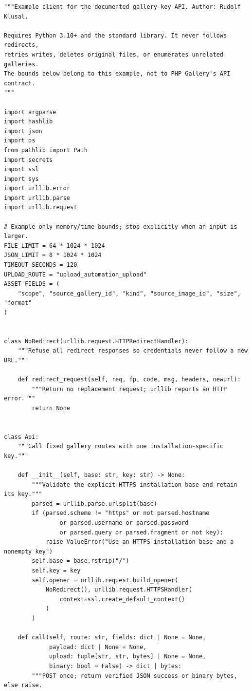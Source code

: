 \documentclass[11pt,a4paper]{article}
\begin{document}
\begin{lstlisting}[language={}]
"""Example client for the documented gallery-key API. Author: Rudolf Klusal.

Requires Python 3.10+ and the standard library. It never follows redirects,
retries writes, deletes original files, or enumerates unrelated galleries.
The bounds below belong to this example, not to PHP Gallery's API contract.
"""

import argparse
import hashlib
import json
import os
from pathlib import Path
import secrets
import ssl
import sys
import urllib.error
import urllib.parse
import urllib.request

# Example-only memory/time bounds; stop explicitly when an input is larger.
FILE_LIMIT = 64 * 1024 * 1024
JSON_LIMIT = 8 * 1024 * 1024
TIMEOUT_SECONDS = 120
UPLOAD_ROUTE = "upload_automation_upload"
ASSET_FIELDS = (
    "scope", "source_gallery_id", "kind", "source_image_id", "size", "format"
)


class NoRedirect(urllib.request.HTTPRedirectHandler):
    """Refuse all redirect responses so credentials never follow a new URL."""

    def redirect_request(self, req, fp, code, msg, headers, newurl):
        """Return no replacement request; urllib reports an HTTP error."""
        return None


class Api:
    """Call fixed gallery routes with one installation-specific key."""

    def __init__(self, base: str, key: str) -> None:
        """Validate the explicit HTTPS installation base and retain its key."""
        parsed = urllib.parse.urlsplit(base)
        if (parsed.scheme != "https" or not parsed.hostname
                or parsed.username or parsed.password
                or parsed.query or parsed.fragment or not key):
            raise ValueError("Use an HTTPS installation base and a nonempty key")
        self.base = base.rstrip("/")
        self.key = key
        self.opener = urllib.request.build_opener(
            NoRedirect(), urllib.request.HTTPSHandler(
                context=ssl.create_default_context()
            )
        )

    def call(self, route: str, fields: dict | None = None,
             payload: dict | None = None,
             upload: tuple[str, str, bytes] | None = None,
             binary: bool = False) -> dict | bytes:
        """POST once; return verified JSON success or binary bytes, else raise.


\end{lstlisting}
\end{document}
